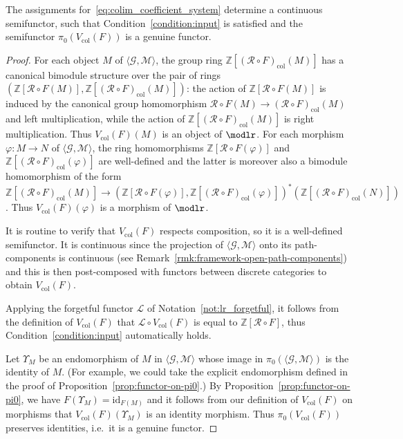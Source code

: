\documentclass[AHL,Unicode,published]{cedram}
\newcommand{\id}{\mathrm{id}}
\newcommand{\col}{\mathrm{col}}
\newcommand{\sR}{\mathscr{R}}
\newcommand{\sL}{\mathscr{L}}
\newcommand{\cG}{\mathcal{G}}
\newcommand{\cM}{\mathcal{M}}
\newcommand{\bZ}{\mathbb{Z}}
\begin{document}
\begin{lemm}\label{lem:colim_coeff_system}
The assignments for~\eqref{eq:colim_coefficient_system} determine a continuous semifunctor, such that Condition~\ref{condition:input} is satisfied and the semifunctor $\pi_{0}(V_{\col}(F))$ is a genuine functor.
\end{lemm}

\begin{proof}
For each object $M$ of $\langle \cG,\cM \rangle$, the group ring $\bZ[(\sR \circ F)_{\col}(M)]$ has a canonical bimodule structure over the pair of rings $(\bZ[\sR \circ F(M)],\bZ[(\sR \circ F)_{\col}(M)])$: the action of $\bZ[\sR \circ F(M)]$ is induced by the canonical group homomorphism $\sR \circ F(M) \to (\sR \circ F)_{\col}(M)$ and left multiplication, while the action of $\bZ[(\sR \circ F)_{\col}(M)]$ is right multiplication. Thus $V_{\col}(F)(M)$ is an object of $\modlr$. For each morphism $\varphi \colon M \to N$ of $\langle \cG,\cM \rangle$, the ring homomorphisms $\bZ[\sR\circ F(\varphi)]$ and $\bZ[(\sR \circ F)_{\col}(\varphi)]$ are well-defined and the latter is moreover also a bimodule homomorphism of the form $\bZ[(\sR \circ F)_{\col}(M)] \to (\bZ[\sR\circ F(\varphi)],\bZ[(\sR \circ F)_{\col}(\varphi)])^{*} (\bZ[(\sR \circ F)_{\col}(N)])$. Thus $V_{\col}(F)(\varphi)$ is a morphism of $\modlr$.

It is routine to verify that $V_{\col}(F)$ respects composition, so it is a well-defined semifunctor. It is continuous since the projection of $\langle \cG, \cM \rangle$ onto its path-components is continuous (see Remark~\ref{rmk:framework-open-path-components}) and this is then post-composed with functors between discrete categories to obtain $V_{\col}(F)$.

Applying the forgetful functor $\sL$ of Notation~\ref{not:lr_forgetful}, it follows from the definition of $V_{\col}(F)$ that $\sL \circ V_{\col}(F)$ is equal to $\bZ[\sR\circ F]$, thus Condition~\ref{condition:input} automatically holds.

Let $\Upsilon_{M}$ be an endomorphism of $M$ in $\langle \cG,\cM \rangle$ whose image in $\pi_{0}(\langle \cG,\cM \rangle)$ is the identity of $M$. (For example, we could take the explicit endomorphism defined in the proof of Proposition~\ref{prop:functor-on-pi0}.) By Proposition~\ref{prop:functor-on-pi0}, we have $F(\Upsilon_{M}) = \id_{F(M)}$ and it follows from our definition of $V_{\col}(F)$ on morphisms that $V_{\col}(F)(\Upsilon_{M})$ is an identity morphism. Thus $\pi_{0}(V_{\col}(F))$ preserves identities, i.e.~it is a genuine functor.
\end{proof}
\end{document}
